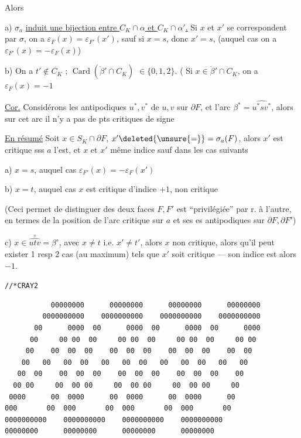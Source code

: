 Alors

a)  $\sigma_a$ \uline{induit une bijection entre $C_K\cap\alpha$ et $C_K\cap\alpha'$.}  Si $x$ et $x'$ se correspondent par $\sigma$, on a $\varepsilon_F(x)=\varepsilon_{F'}(x')$, sauf si $x=s$, donc $x'=s$, (auquel cas on a $\varepsilon_{F'}(x)=-\varepsilon_F(x)$)

b) On a $t'\notin C_K$ ;   $\operatorname{Card}(\mathring{\beta}'\cap C_K)$  $\in\{0,1,2\}$. (   Si $x\in\mathring{\beta}'\cap C_K$, on a $\varepsilon_F(x)=-1$

\uline{Cor.} Considérons les antipodiques $u^*,v^*$ de $u,v$ sur $\partial F$, et l'arc $\beta^*=\widehat{u^*sv^*}$,  alors sur cet arc il n'y a pas de pts critiques de signe 

\uline{En résumé} \quad Soit $x\in S_K\cap\partial F$,  $x'\deleted{\unsure{=}}=\sigma_a(F)$, alors $x'$ est critique sss $a$ l'est, et $x$ et $x'$  même indice sauf dans les cas suivants

a) $x=s$, auquel cas $\varepsilon_{F'}(x)=-\varepsilon_F(x')$

b) $x=t$, auquel cas  $x$ est critique d'indice $+1$,  non critique

(Ceci permet de distinguer   des deux faces $F,F'$ est ``privilégiée'' par r. à l'autre, en termes de la position de l'arc critique  sur $a$ et ses es antipodiques sur $\partial F,\partial F'$)

c) $x\in\overset{\circ}{\widehat{utv}}=\beta^\circ$, avec $x\ne t$ i.e. $x'\ne t'$, alors $x$ non critique, alors qu'il peut exister 1 resp 2 cas (au maximum) tels que $x'$ soit critique --- son indice est alors $-1$.


\texttt{//*\quad CRAY2\qquad {}}

{\scriptsize
\begin{verbatim}
           00000000      00000000      00000000      00000000
         0000000000    0000000000    0000000000    0000000000
       00      0000  00      0000  00      0000  00      0000
      00     00 00  00     00 00  00     00 00  00     00 00
     00    00  00  00    00  00  00    00  00  00    00  00
    00   00   00  00   00   00  00   00   00  00   00   00
   00  00    00  00  00    00  00  00    00  00  00    00
  00 00     00  00 00     00  00 00     00  00 00     00
 0000      00  0000      00  0000      00  0000      00
000       00  000       00  000       00  000       00
0000000000    0000000000    0000000000    0000000000
00000000      00000000      00000000      00000000
\end{verbatim}
}

